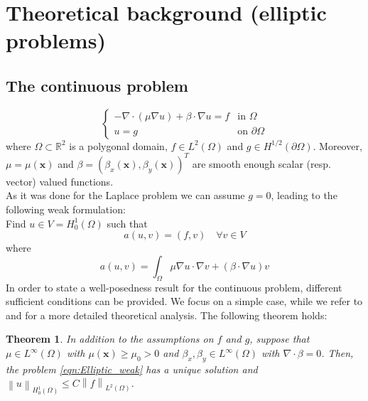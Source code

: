 \documentclass[10pt]{article}
\newcommand{\norm}[2]{\left\lVert#1\right\rVert_{#2}}
\newtheorem{theorem}{Theorem}
\begin{document}
\newpage

\section{Theoretical background (elliptic problems)} \label{sec:theory_general}
\subsection{The continuous problem}
\begin{equation}
\begin{cases}
-\nabla \cdot (\mu \nabla u)+\beta \cdot \nabla u = f & \mbox{in } \Omega \\
u = g & \mbox{on } \partial \Omega
\end{cases}
\end{equation}
where $\Omega \subset \mathbb{R}^2$ is a polygonal domain, $f \in L^2(\Omega)$ and $g \in H^{1/2}(\partial \Omega)$. Moreover, $\mu=\mu(\mathbf{x})$ and $\beta=(\beta_x(\mathbf{x}), \beta_y(\mathbf{x}))^T$ are smooth enough scalar (resp. vector) valued functions.
\\
As it was done for the Laplace problem we can assume $g=0$, leading to the following weak formulation: \\
Find $u \in V=H_0^1(\Omega)$ such that
\begin{equation}
a(u,v) = (f,v) \quad \forall v \in V
\label{eqn:Elliptic_weak}
\end{equation}
where $$a(u,v)=\int_{\Omega} \mu \nabla u \cdot \nabla v + (\beta \cdot \nabla u) v$$
In order to state a well-posedness result for the continuous problem, different sufficient conditions can be provided. We focus on a simple case, while we refer to \cite{Salsa} and \cite{Quarteroni} for a more detailed theoretical analysis. The following theorem holds:\\
\begin{theorem}
	In addition to the assumptions on $f$ and $g$, suppose that $\mu \in L^\infty(\Omega)$ with $\mu(\mathbf{x})\geq\mu_0>0$ and $\beta_x,\beta_y \in L^\infty(\Omega)$ with $\nabla \cdot \beta =0$. Then, the problem \eqref{eqn:Elliptic_weak} has a unique solution and $\norm{u}{H_0^1(\Omega)} \leq C\norm{f}{L^2(\Omega)}$.
\end{theorem}
\end{document}
